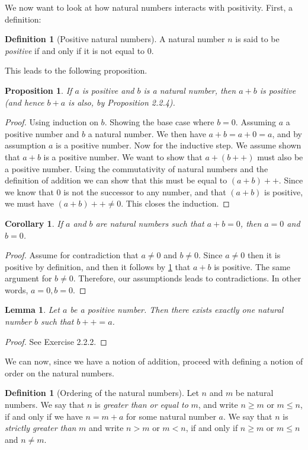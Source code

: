 \documentclass[a4paper, twocolumn]{report}
\newcounter{dummy} \numberwithin{dummy}{section}
\newtheorem{prp}[dummy]{Proposition}
\newtheorem{lma}[dummy]{Lemma}
\newtheorem{crl}[dummy]{Corollary}
\theoremstyle{definition}
\newtheorem{defn}[dummy]{Definition}
\theoremstyle{solution}
\newcommand{\dplus}{{+}{+}} %
\begin{document}
We now want to look at how natural numbers interacts with positivity. First, a definition:
\begin{defn}[Positive natural numbers]
  \label{defn_227}
  A natural number $n$ is said to be \textit{positive} if and only if it is not equal to $0$.
\end{defn}

This leads to the following proposition.
\begin{prp}
  \label{prp_228}
  If $a$ is positive and $b$ is a natural number, then $a + b$ is positive (and hence $b + a$ is also, by Proposition 2.2.4).
\end{prp}
\begin{proof}
  Using induction on $b$. Showing the base case where $b = 0$.  Assuming $a$ a
  positive number and $b$ a natural number.  We then have $ a + b = a + 0 = a$,
  and by assumption $a$ is a positive number.  Now for the inductive step. We
  assume shown that $a + b$ is a positive number.  We want to show that $a + (
  b\dplus)$ must also be a positive number. Using the commutativity of natural
  numbers and the definition of addition we can show that this must be equal to
  $(a + b)\dplus$. Since we know that $0$ is not the successor to any number,
  and that $(a + b)$ is positive, we must have $(a + b)\dplus \neq 0$. This
  closes the induction.
\end{proof}

\begin{crl}
  \label{crl_229}
  If $a$ and $b$ are natural numbers such that $a + b = 0$, then $a = 0$ and $b = 0$. 
\end{crl}
\begin{proof}
  Assume for contradiction that $a \neq 0$ and $b \neq 0$.  Since $a \neq 0$
  then it is positive by definition, and then it follows by \ref{prp_228} that
  $a + b$ is positive.  The same argument for $b \neq 0$. Therefore, our
  assumptionds leads to contradictions. In other words, $a = 0, b = 0$.
\end{proof}

\begin{lma}
  \label{lma_2210}
  Let $a$ be a positive number. Then there exists exactly one natural number
  $b$ such that $b\dplus = a$.
\end{lma}
\begin{proof}
  See Exercise 2.2.2.
\end{proof}

We can now, since we have a notion of addition, proceed with defining a notion
of order on the natural numbers.
\begin{defn}[Ordering of the natural numbers]
  \label{defn_2211}
  Let $n$ and $m$ be natural numbers. We say that $n$ is \textit{greater than
  or equal to} $m$, and write $n \geq m$ or $m \leq n$, if and only if we have
  $n = m + a$ for some natural number $a$.  We say that $n$ is \textit{strictly
  greater than} $m$ and write $n > m$ or $m < n$, if and only if $n \geq m$ or
  $m \leq n$ and $n \neq m$.
\end{defn}
\end{document}
